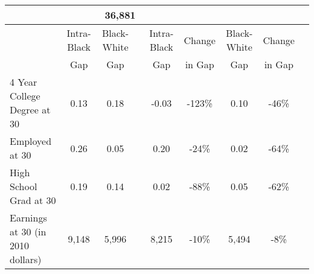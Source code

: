 \begin{table}[htbp]
\begin{center}
\begin{tabular}{lcccccccc}
 &\multicolumn{4}{c}{      36,881} &
 \\[0.2cm]  
\hline
&Intra-Black &Black-White & &Intra-Black &Change &Black-White &Change  \\[0.02cm] 
&Gap &Gap & &Gap &in Gap &Gap &in Gap  \\[0.01cm] 
\hline
4 Year College Degree at 30 &        0.13&        0.18&&       -0.03&        -123\% &        0.10&         -46\% &
 \\[0.2cm]  
Employed at 30 &        0.26&        0.05&&        0.20&         -24\% &        0.02&         -64\% &
 \\[0.2cm]  
High School Grad at 30 &        0.19&        0.14&&        0.02&         -88\% &        0.05&         -62\% &
 \\[0.2cm]  
Earnings at 30 (in 2010 dollars) &       9,148&       5,996&&       8,215&         -10\% &       5,494&          -8\% &
 \\[0.2cm]  
  \hline \hline    \end{tabular}
 \end{center} 
       {\scriptsize  
       {\raggedright 
}}
\end{table}
